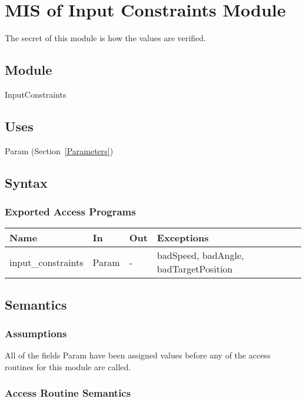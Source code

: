 \documentclass[12pt, titlepage]{article}
\begin{document}
\section{MIS of Input Constraints Module} \label{VerifyInput}

The secret of this module is how the values are verified.

\subsection{Module}

InputConstraints

\subsection{Uses}

Param (Section~\ref{Parameters})

\subsection{Syntax}

\subsubsection{Exported Access Programs}

\begin{center}
 \begin{tabular}{p{3cm} p{3cm} p{1cm} p{8cm}}
 \hline
 \textbf{Name} & \textbf{In} & \textbf{Out} & \textbf{Exceptions} \\
 \hline
 input\_constraints & Param & - & badSpeed, badAngle, badTargetPosition \\
 \hline
 \end{tabular}
 \end{center}

\subsection{Semantics}

\subsubsection{Assumptions}

All of the fields Param have been assigned values before any of the access
 routines for this module are called.

\subsubsection{Access Routine Semantics}
\end{document}
